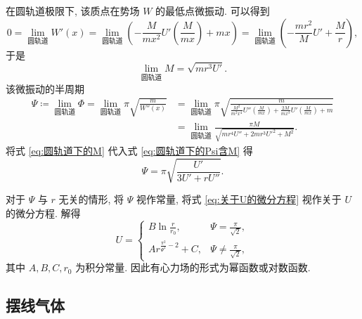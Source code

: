 \documentclass{article}
\begin{document}
在圆轨道极限下, 该质点在势场 $W$ 的最低点微振动. 可以得到
\begin{equation}
	0=\lim_{\text{圆轨道}}W'\!\left(x\right)=\lim_{\text{圆轨道}}\left(-\frac M{mx^2}U'\!\left(\frac M{mx}\right)+mx\right)
	=\lim_{\text{圆轨道}}\left(-\frac{mr^2}MU'+\frac Mr\right),
\end{equation}
于是
\begin{equation}
	\label{eq:圆轨道下的M}
	\lim_{\text{圆轨道}}M=\sqrt{mr^3U'}.
\end{equation}
该微振动的半周期
\begin{equation}
	\label{eq:圆轨道下的Psi含M}
	\begin{split}
	\Psi\coloneqq\lim_{\text{圆轨道}}\Phi=\lim_{\text{圆轨道}}\pi\sqrt{\frac m{W''\!\left(x\right)}}&=
	\lim_{\text{圆轨道}}\pi\sqrt{\frac{m}{\frac{M^2}{m^2x^4}U''\!\left(\frac M{mx}\right)+\frac{2M}{mx^3}U'\!\left(\frac M{mx}\right)+m}}\\
	&=\lim_{\text{圆轨道}}\frac{\pi M}{\sqrt{mr^4U''+2mr^3U'^2+M^2}}.
	\end{split}
\end{equation}
将式 \ref{eq:圆轨道下的M} 代入式 \ref{eq:圆轨道下的Psi含M} 得
\begin{equation}
	\label{eq:关于U的微分方程}
	\Psi=\pi\sqrt{\frac{U'}{3U'+rU''}}.
\end{equation}

对于 $\Psi$ 与 $r$ 无关的情形, 将 $\Psi$ 视作常量, 将式 \ref{eq:关于U的微分方程} 视作关于 $U$ 的微分方程. 解得
\begin{equation}
	U=\begin{cases}
	B\ln\frac{r}{r_0},&\Psi=\frac\pi{\sqrt2},\\
	Ar^{\frac{\pi^2}{\Psi^2}-2}+C,&\Psi\ne\frac\pi{\sqrt2},
	\end{cases}
\end{equation}
其中 $A,B,C,r_0$ 为积分常量. 因此有心力场的形式为幂函数或对数函数.

\subsection{摆线气体}
\end{document}
